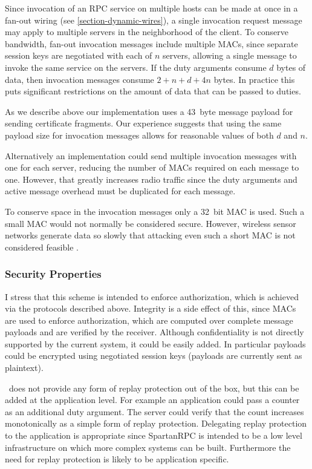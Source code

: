 Since invocation of an RPC service on multiple hosts can be made at once in a fan-out wiring
(see \autoref{section-dynamic-wires}), a single invocation request message may apply to multiple
servers in the neighborhood of the client. To conserve bandwidth, fan-out invocation messages
include multiple MACs, since separate session keys are negotiated with each of $n$ servers,
allowing a single message to invoke the same service on the servers. If the duty arguments
consume $d$ bytes of data, then invocation messages consume $2 + n + d + 4n$ bytes. In practice
this puts significant restrictions on the amount of data that can be passed to duties.

As we describe above our implementation uses a 43~byte message payload for sending certificate
fragments. Our experience suggests that using the same payload size for invocation messages
allows for reasonable values of both $d$ and $n$.

Alternatively an implementation could send multiple invocation messages with one for each
server, reducing the number of MACs required on each message to one. However, that greatly
increases radio traffic since the duty arguments and active message overhead must be duplicated
for each message.

To conserve space in the invocation messages only a 32~bit MAC is used. Such a small MAC would
not normally be considered secure. However, wireless sensor networks generate data so slowly
that attacking even such a short MAC is not considered feasible
\cite{karlog-tinysec-2004,luk-minisec-2007}.


\subsubsection{Security Properties}
\label{section-security-properties}

I stress that this scheme is intended to enforce authorization, which is achieved via the
protocols described above. Integrity is a side effect of this, since MACs are used to enforce
authorization, which are computed over complete message payloads and are verified by the
receiver. Although confidentiality is not directly supported by the current system, it could be
easily added. In particular payloads could be encrypted using negotiated session keys (payloads
are currently sent as plaintext).

\Sprocket\ does not provide any form of replay protection out of the box, but this can be added
at the application level. For example an application could pass a counter as an additional duty
argument. The server could verify that the count increases monotonically as a simple form of
replay protection. Delegating replay protection to the application is appropriate since
SpartanRPC is intended to be a low level infrastructure on which more complex systems can be
built. Furthermore the need for replay protection is likely to be application specific.

